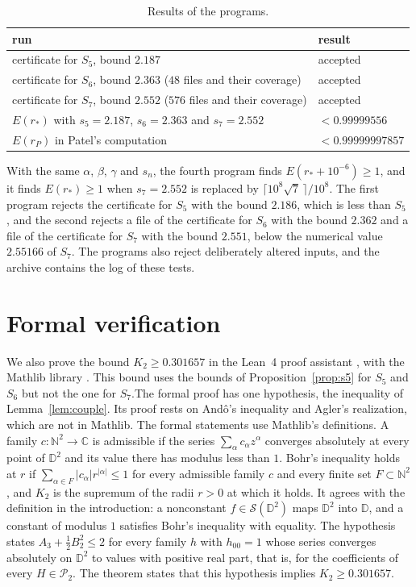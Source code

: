 \documentclass[11pt]{amsart}
\theoremstyle{remark}
\numberwithin{equation}{section}
\newcommand{\C}{\mathbb{C}}
\newcommand{\D}{\mathbb{D}}
\newcommand{\Pclass}{\mathcal{P}_2}
\newcommand{\FiveOwn}{2.187}
\newcommand{\Evalue}{0.99999556}
\newcommand{\SixOwn}{2.363}
\newcommand{\EvaluePatel}{0.99999997857}
\newcommand{\lean}[1]{\texttt{\detokenize{#1}}}
\newcommand{\LeanBound}{0.301657}
\newcommand{\SevenOwn}{2.552}
\newcommand{\SevenNum}{2.55166}
\newcommand{\NFilesSeven}{576}
\begin{document}
\begin{table}[ht]
\centering
\caption{Results of the programs.}\label{tab:checks}
\begin{tabular}{@{}ll@{}}
\toprule
run & result\\
\midrule
certificate for $S_5$, bound $\FiveOwn$ & accepted\\
certificate for $S_6$, bound $\SixOwn$ ($48$ files and their coverage) & accepted\\
certificate for $S_7$, bound $\SevenOwn$ ($\NFilesSeven$ files and their coverage) & accepted\\
$E(r_*)$ with $s_5=\FiveOwn$, $s_6=\SixOwn$ and $s_7=\SevenOwn$ & ${}<\Evalue$\\
$E(r_P)$ in Patel's computation \cite{PatMDB} & ${}<\EvaluePatel$\\
\bottomrule
\end{tabular}
\end{table}

With the same $\alpha$, $\beta$, $\gamma$ and $s_n$, the fourth program finds $E(r_*+10^{-6})\ge1$, and it finds $E(r_*)\ge1$ when $s_7=\SevenOwn$ is replaced by $\lceil10^8\sqrt7\,\rceil/10^8$. The first program rejects the certificate for $S_5$ with the bound $2.186$, which is less than $S_5$ \cite{Ye26}, and the second rejects a file of the certificate for $S_6$ with the bound $2.362$ and a file of the certificate for $S_7$ with the bound $2.551$, below the numerical value $\SevenNum$ of $S_7$. The programs also reject deliberately altered inputs, and the archive contains the log of these tests.{}

\section{Formal verification}\label{sec:lean}

We also prove the bound $K_2\ge\LeanBound$ in the Lean~4 proof assistant \cite{Lean4}, with the Mathlib library \cite{Mathlib}. This bound uses the bounds of Proposition~\ref{prop:s5} for $S_5$ and $S_6$ but not the one for $S_7$.The formal proof has one hypothesis, the inequality of Lemma~\ref{lem:couple}. Its proof rests on And\^o's inequality and Agler's realization, which are not in Mathlib. The formal statements use Mathlib's definitions. A family $c\colon\mathbb N^2\to\C$ is admissible if the series $\sum_\alpha c_\alpha z^\alpha$ converges absolutely at every point of $\D^2$ and its value there has modulus less than $1$. Bohr's inequality holds at $r$ if $\sum_{\alpha\in F}|c_\alpha|r^{|\alpha|}\le1$ for every admissible family $c$ and every finite set $F\subset\mathbb N^2$, and $K_2$ is the supremum of the radii $r>0$ at which it holds. It agrees with the definition in the introduction: a nonconstant $f\in\mathcal S(\D^2)$ maps $\D^2$ into $\D$, and a constant of modulus $1$ satisfies Bohr's inequality with equality. The hypothesis states $A_3+\tfrac12B_2^2\le2$ for every family $h$ with $h_{00}=1$ whose series converges absolutely on $\D^2$ to values with positive real part, that is, for the coefficients of every $H\in\Pclass$. The theorem \lean{Bohr59aN.K2_ge_N} states that this hypothesis implies $K_2\ge\LeanBound$.
\end{document}
